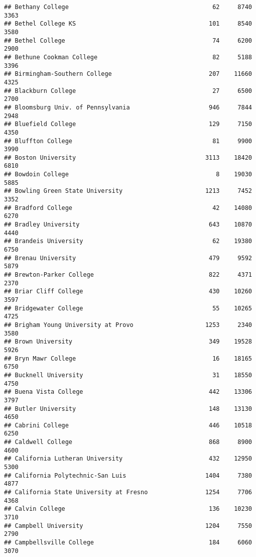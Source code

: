 \documentclass[
]{article}
\begin{document}
\begin{verbatim}
## Bethany College                                        62     8740       3363
## Bethel College KS                                     101     8540       3580
## Bethel College                                         74     6200       2900
## Bethune Cookman College                                82     5188       3396
## Birmingham-Southern College                           207    11660       4325
## Blackburn College                                      27     6500       2700
## Bloomsburg Univ. of Pennsylvania                      946     7844       2948
## Bluefield College                                     129     7150       4350
## Bluffton College                                       81     9900       3990
## Boston University                                    3113    18420       6810
## Bowdoin College                                         8    19030       5885
## Bowling Green State University                       1213     7452       3352
## Bradford College                                       42    14080       6270
## Bradley University                                    643    10870       4440
## Brandeis University                                    62    19380       6750
## Brenau University                                     479     9592       5879
## Brewton-Parker College                                822     4371       2370
## Briar Cliff College                                   430    10260       3597
## Bridgewater College                                    55    10265       4725
## Brigham Young University at Provo                    1253     2340       3580
## Brown University                                      349    19528       5926
## Bryn Mawr College                                      16    18165       6750
## Bucknell University                                    31    18550       4750
## Buena Vista College                                   442    13306       3797
## Butler University                                     148    13130       4650
## Cabrini College                                       446    10518       6250
## Caldwell College                                      868     8900       4600
## California Lutheran University                        432    12950       5300
## California Polytechnic-San Luis                      1404     7380       4877
## California State University at Fresno                1254     7706       4368
## Calvin College                                        136    10230       3710
## Campbell University                                  1204     7550       2790
## Campbellsville College                                184     6060       3070

\end{verbatim}
\end{document}

